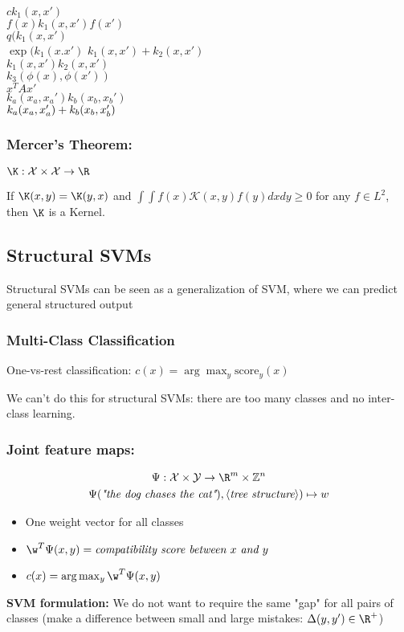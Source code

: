 \begin{multicols}{3}
	$ck_1(x,x')$ \\ $f(x) k_1(x,x')f(x')$ \\ $q(k_1(x,x')$ \\ $\exp(k_1(x.x')$
	$k_1(x,x') + k_2(x,x')$ \\ $k_1(x,x')k_2(x,x')$ \\ $k_3(\phi(x), \phi(x'))$ \\ 
	$x^TAx'$ \\ $k_a(x_a, x_a')k_b(x_b, x_b')$ \\ $k_a(x_a, x_a') +\\ k_b(x_b, x_b')$
\end{multicols}

\subsubsection{Mercer's Theorem: }
$\K: \mathcal X \times \mathcal X \to \R$

If $\K(x,y) = \K(y,x)$ and $\int\int f(x) \mathcal K(x,y)f(y) dxdy \geq 0$ for any $f\in L^2$, then $\K$ is a Kernel.



\subsection{Structural SVMs}
Structural SVMs can be seen as a generalization of SVM, where we can predict general structured output
\subsubsection{Multi-Class Classification}
One-vs-rest classification: $c(x) =\arg\max_y \text{score}_y(x)$

We can't do this for structural SVMs: there are too many classes and no inter-class learning.

\subsubsection{Joint feature maps: }
\begin{equation*}
	\begin{gathered}
		\Psi: \mathcal X \times \mathcal Y \to \R^m \times \mathbb Z^n \\
		\Psi(\textit{"the dog chases the cat"}), \langle \textit{tree structure} \rangle) \mapsto w
	\end{gathered}
\end{equation*}
\begin{itemize}
	\item One weight vector for all classes
	\item $\w^T\Psi(x,y) = \textit{compatibility score between $x$ and $y$}$
	\item $c(x) = \arg\max_y \w^T\Psi(x,y)$
\end{itemize}
\textbf{SVM formulation: }
We do not want to require the same "gap" for all pairs of classes (make a difference between small and large mistakes: $\Delta(y,y')\in \R^+$)

